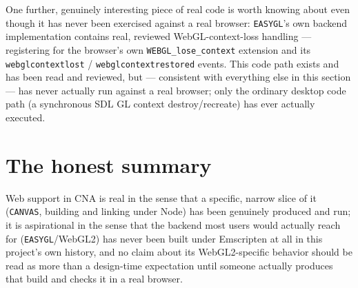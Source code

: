 One further, genuinely interesting piece of real code is worth knowing about even though it
has never been exercised against a real browser: \texttt{EASYGL}'s own backend implementation
contains real, reviewed WebGL-context-loss handling --- registering for the browser's own
\texttt{WEBGL\_lose\_context} extension and its \texttt{webglcontextlost} /
\texttt{webglcontextrestored} events. This code path exists and has been read and reviewed,
but --- consistent with everything else in this section --- has never actually run against a
real browser; only the ordinary desktop code path (a synchronous SDL GL context
destroy/recreate) has ever actually executed.

\section{The honest summary}

Web support in CNA is real in the sense that a specific, narrow slice of it (\texttt{CANVAS},
building and linking under Node) has been genuinely produced and run; it is aspirational in
the sense that the backend most users would actually reach for (\texttt{EASYGL}/WebGL2) has
never been built under Emscripten at all in this project's own history, and no claim about
its WebGL2-specific behavior should be read as more than a design-time expectation until
someone actually produces that build and checks it in a real browser.
